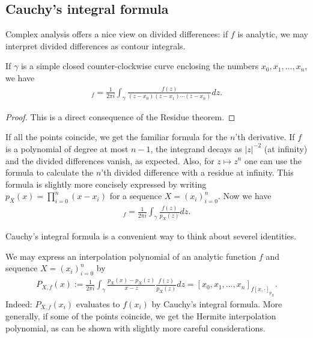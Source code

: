 \subsection{Cauchy's integral formula}

Complex analysis offers a nice view on divided differences: if $f$ is analytic, we may interpret divided differences as contour integrals.

\begin{lem}\label{div_cauchy}
If $\gamma$ is a simple closed counter-clockwise curve enclosing the numbers $x_{0}, x_{1}, \ldots, x_{n}$, we have
\begin{align*}
	[x_{0}, x_{1}, \ldots, x_{n}]_{f} = \frac{1}{2 \pi i} \int_{\gamma} \frac{f(z)}{(z - x_{0})(z - x_{1}) \cdots (z - x_{n})} dz.
\end{align*}
\end{lem}
\begin{proof}
	This is a direct consequence of the Residue theorem.
\end{proof}

If all the points coincide, we get the familiar formula for the $n$'th derivative. If $f$ is a polynomial of degree at most $n - 1$, the integrand decays as $|z|^{-2}$ (at infinity) and the divided differences vanish, as expected. Also, for $z \mapsto z^{n}$ one can use the formula to calculate the $n$'th divided difference with a residue at infinity. This formula is slightly more concisely expressed by writing $p_{X}(x) = \prod_{i = 0}^{n} (x - x_{i})$ for a sequence $X = (x_{i})_{i = 0}^{n}$. Now we have
\begin{align*}
	[x_{0}, x_{1}, \ldots, x_{n}]_{f} = \frac{1}{2 \pi i} \int_{\gamma} \frac{f(z)}{p_{X}(z)} dz.
\end{align*}

Cauchy's integral formula is a convenient way to think about severel identities.

\begin{esim}
We may express an interpolation polynomial of an analytic function $f$ and sequence $X = (x_{i})_{i = 0}^{n}$ by
\begin{align*}
	P_{X, f}(x) := \frac{1}{2 \pi i} \int_{\gamma} \frac{p_{X}(x) - p_{X}(z)}{x - z}\frac{f(z)}{p_{X}(z)} dz = [x_{0}, x_{1}, \ldots, x_{n}]_{f [x, \cdot]_{p_{X}}}.
\end{align*}
Indeed: $P_{X, f}(x_{i})$ evaluates to $f(x_{i})$ by Cauchy's integral formula. More generally, if some of the points coincide, we get the Hermite interpolation polynomial, as can be shown with slightly more careful considerations.
\end{esim}

